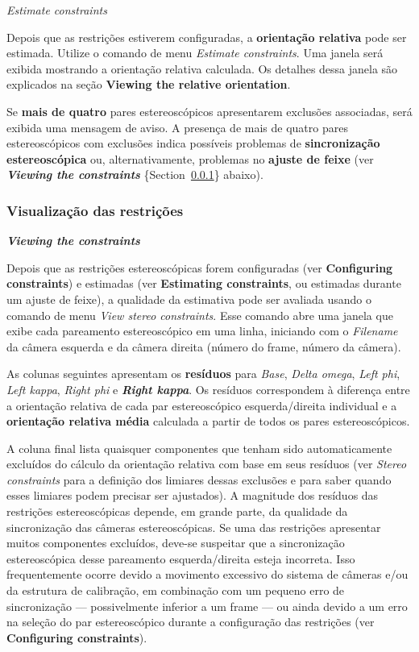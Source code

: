 \documentclass[
  12pt,
  letterpaper,
  DIV=11,
  numbers=noendperiod]{scrreprt}
\begin{document}
\emph{Estimate constraints}

Depois que as restrições estiverem configuradas, a \textbf{orientação
relativa} pode ser estimada. Utilize o comando de menu \emph{Estimate
constraints}. Uma janela será exibida mostrando a orientação relativa
calculada. Os detalhes dessa janela são explicados na seção
\textbf{Viewing the relative orientation}.

Se \textbf{mais de quatro} pares estereoscópicos apresentarem exclusões
associadas, será exibida uma mensagem de aviso. A presença de mais de
quatro pares estereoscópicos com exclusões indica possíveis problemas de
\textbf{sincronização estereoscópica} ou, alternativamente, problemas no
\textbf{ajuste de feixe} (ver \textbf{\emph{Viewing the constraints}}
\{Section~\ref{sec-view.constraint}\} abaixo).

\subsubsection{\texorpdfstring{\textbf{Visualização das
restrições}}{Visualização das restrições}}\label{sec-view.constraint}

\textbf{\emph{Viewing the constraints}}

Depois que as restrições estereoscópicas forem configuradas (ver
\textbf{Configuring constraints}) e estimadas (ver \textbf{Estimating
constraints}, ou estimadas durante um ajuste de feixe), a qualidade da
estimativa pode ser avaliada usando o comando de menu \emph{View stereo
constraints}. Esse comando abre uma janela que exibe cada pareamento
estereoscópico em uma linha, iniciando com o \emph{Filename} da câmera
esquerda e da câmera direita (número do frame, número da câmera).

As colunas seguintes apresentam os \textbf{resíduos} para \emph{Base},
\emph{Delta omega}, \emph{Left phi}, \emph{Left kappa}, \emph{Right phi}
e \textbf{\emph{Right kappa}}. Os resíduos correspondem à diferença
entre a orientação relativa de cada par estereoscópico esquerda/direita
individual e a \textbf{orientação relativa média} calculada a partir de
todos os pares estereoscópicos.

A coluna final lista quaisquer componentes que tenham sido
automaticamente excluídos do cálculo da orientação relativa com base em
seus resíduos (ver \emph{Stereo constraints} para a definição dos
limiares dessas exclusões e para saber quando esses limiares podem
precisar ser ajustados). A magnitude dos resíduos das restrições
estereoscópicas depende, em grande parte, da qualidade da sincronização
das câmeras estereoscópicas. Se uma das restrições apresentar muitos
componentes excluídos, deve-se suspeitar que a sincronização
estereoscópica desse pareamento esquerda/direita esteja incorreta. Isso
frequentemente ocorre devido a movimento excessivo do sistema de câmeras
e/ou da estrutura de calibração, em combinação com um pequeno erro de
sincronização --- possivelmente inferior a um frame --- ou ainda devido
a um erro na seleção do par estereoscópico durante a configuração das
restrições (ver \textbf{Configuring constraints}).
\end{document}
